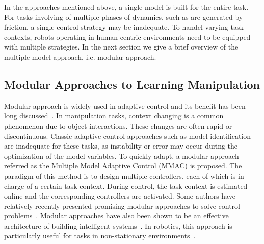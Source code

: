 
In the approaches mentioned above, a single model is built for the
entire task. For tasks involving of multiple phases of dynamics, such
as are generated by friction, a single control strategy may be inadequate. To handel
varying task contexts, robots operating in human-centric environments
need to be equipped with multiple strategies. In the next section we
give a brief overview of the multiple model approach, i.e. modular approach.


\subsection{Modular Approaches to Learning Manipulation}


Modular approach is widely used in adaptive control and its benefit has been long discussed~\citep{athans1977stochastic,jacobs1991adaptive,narendra1995adaptation,narendra1997adaptive}.
In manipulation tasks, context changing is a common phenomenon due to object interactions. These changes are often rapid or discontinuous. Classic adaptive control approaches such as model
identification~\citep{khalil2004modeling} are inadequate for these
tasks, as instability or error may occur during the optimization of
the model variables. To quickly adapt, a modular approach referred as the Multiple Model Adaptive Control (MMAC) is proposed. The paradigm of this method is to design multiple controllers, each of which is in charge of a certain task
context. During control, the task context is estimated online and the corresponding controllers are activated. Some authors have relatively recently presented promising modular approaches to solve control problems~\citep{fekri2007robust,kuipers2010multiple}. Modular approaches have also been shown to be an effective architecture of building intelligent systems~\citep{mobile98,BrysonJETAI00,BrysonIJCAI01}. In robotics,
this approach is particularly useful for tasks in non-stationary
environments~\citep{sugimoto2012emosaic}.


